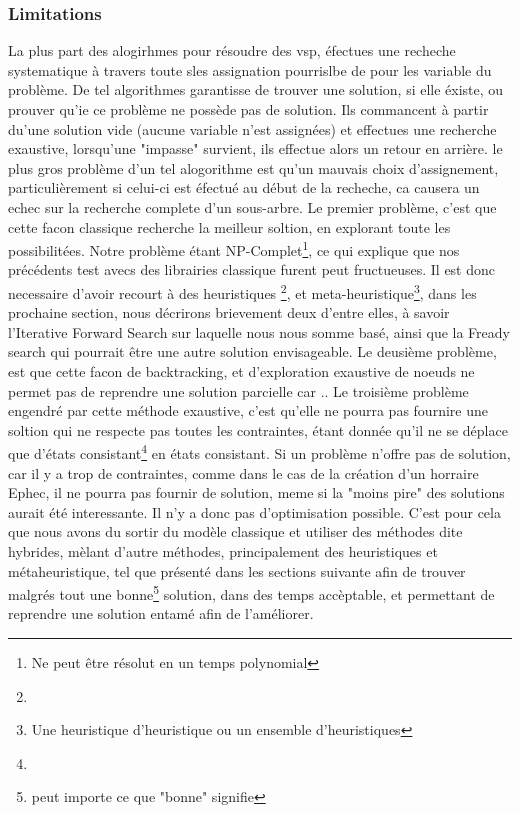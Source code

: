 \subsubsection{Limitations}
La plus part des alogirhmes pour résoudre des vsp, éfectues une recheche systematique à travers toute sles assignation pourrislbe de pour les variable du problème. De tel algorithmes garantisse de trouver une solution, si elle éxiste, ou prouver qu'ie ce problème ne possède pas de solution.  
Ils commancent à partir du'une solution vide (aucune variable n'est assignées) et effectues une recherche exaustive, lorsqu'une "impasse" survient, ils effectue alors un retour en arrière. le plus gros problème d'un tel alogorithme est qu'un mauvais choix d'assignement, particulièrement si celui-ci est éfectué au début de la recheche, ca causera un echec sur la recherche complete d'un sous-arbre. 
Le premier problème, c'est que cette facon classique recherche la meilleur soltion, en explorant toute les possibilitées. Notre problème étant NP-Complet\footnote{Ne peut être résolut en un temps polynomial}, ce qui explique que nos précédents test avecs des librairies classique furent peut fructueuses.
Il est donc necessaire d'avoir recourt à des heuristiques \footnote{}, et meta-heuristique\footnote{Une heuristique d'heuristique ou un ensemble d'heuristiques}, dans les prochaine section, nous décrirons brievement deux d'entre elles, à savoir l'Iterative Forward Search sur laquelle nous nous somme basé, ainsi que la Fready search qui pourrait être une autre solution envisageable.
\newline
\indent
Le deusième problème, est que cette facon de backtracking, et d'exploration exaustive de noeuds ne permet pas de reprendre une solution parcielle car ..
\newline
\indent
Le troisième problème engendré par cette méthode exaustive, c'est qu'elle ne pourra pas fournire une soltion qui ne respecte pas toutes les contraintes, étant donnée qu'il ne se déplace que d'états consistant\footnote{} en états consistant. Si un problème n'offre pas de solution, car il y a trop de contraintes, comme dans le cas de la création d'un horraire Ephec, il ne pourra pas fournir de solution, meme si la "moins pire" des solutions aurait été interessante. Il n'y a donc pas d'optimisation possible.
\newline
\indent
C'est pour cela que nous avons du sortir du modèle classique et utiliser des méthodes dite hybrides, mèlant d'autre méthodes, principalement des heuristiques et métaheuristique, tel que présenté dans les sections suivante afin de trouver malgrés tout une bonne\footnote{peut importe ce que "bonne" signifie} solution, dans des temps accèptable, et permettant de reprendre une solution entamé afin de l'améliorer. \newline

